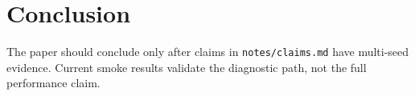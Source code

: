 \section{Conclusion}

The paper should conclude only after claims in \texttt{notes/claims.md} have
multi-seed evidence. Current smoke results validate the diagnostic path, not the
full performance claim.
